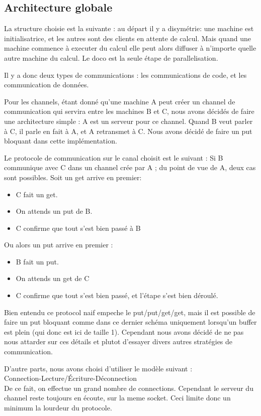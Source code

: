 \documentclass[a4paper]{article}
\begin{document}
\subsection{Architecture globale}
La structure choisie est la suivante : au départ il y a disymétrie: une
machine est initialisatrice, et les autres sont des clients en attente de
calcul. Mais quand une machine commence à executer du calcul elle peut
alors diffuser à n'importe quelle autre machine du calcul. Le doco est la seule étape de
parallelisation.

Il y a donc deux types de communications : les communications de code, et
les communication de données.


Pour les channels, étant donné qu'une machine A peut créer un channel de
communication qui servira entre les machines B et C, nous avons décidés
de faire une architecture simple : A est un serveur pour ce channel.
Quand B veut parler à C, il parle en fait à A, et A retransmet à C.
Nous avons décidé de faire un put bloquant dans cette implémentation.


Le protocole de communication sur le canal choisit est le suivant : 
Si B communique avec C dans un channel crée par A ; du point de vue de A, deux cas sont
possibles. Soit un get arrive en premier: 
\begin{itemize}
\item C fait un get.
\item On attends un put de B.
\item C confirme que tout s'est bien passé à B 
\end{itemize}

Ou alors un put arrive en premier :

\begin{itemize}
\item B fait un put.
\item On attends un get de C
\item C confirme que tout s'est bien passé, et l'étape s'est bien
déroulé.
\end{itemize}

Bien entendu ce protocol naif empeche le put/put/get/get, mais il est
possible de faire un put bloquant comme dans ce dernier schéma
uniquement lorsqu'un buffer est plein (qui donc est ici de taille 1). Cependant nous avons décidé de ne
pas nous attarder sur ces détails et plutot d'essayer divers autres
stratégies de communication.

D'autre parts, nous avons choisi d'utiliser le modèle suivant :\\
Connection-Lecture/Écriture-Déconnection \\
De ce fait, on effectue un grand nombre de connections. Cependant le
serveur du channel reste toujours en écoute, sur la meme socket. Ceci
limite donc un minimum la lourdeur du protocole.
\end{document}
